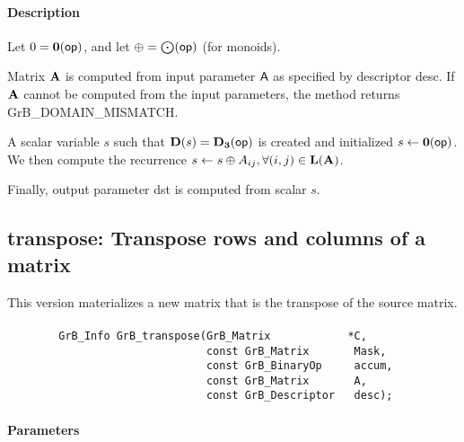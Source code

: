 \paragraph{Description}


Let $0 = \bold{0}({\sf op})$, and let $\oplus = \bigodot({\sf op})$ (for monoids).

Matrix ${\bf A}$ is computed from input parameter ${\sf A}$ as
specified by descriptor {\sf desc}. If ${\bf A}$ cannot be computed
from the input parameters, the method returns {\sf GrB\_DOMAIN\_MISMATCH}.

A scalar variable $s$ such that $\bold{D}(s) = \bold{D_3}({\sf op})$ is
created and initialized $s \leftarrow \bold{0}({\sf op})$. 
We then compute the recurrence $s \leftarrow s \oplus A_{ij}, \forall (i, j) \in \bold{L}({\bf A})$.

Finally, output parameter {\sf dst} is computed from scalar $s$.


\subsection{{\sf transpose}: Transpose rows and columns of a matrix}

This version materializes a new matrix that is the transpose of the source matrix.


\paragraph{\syntax}

\begin{verbatim}
        GrB_Info GrB_transpose(GrB_Matrix            *C,
                               const GrB_Matrix       Mask,
                               const GrB_BinaryOp     accum,
                               const GrB_Matrix       A,
                               const GrB_Descriptor   desc);
\end{verbatim}

\paragraph{Parameters}

